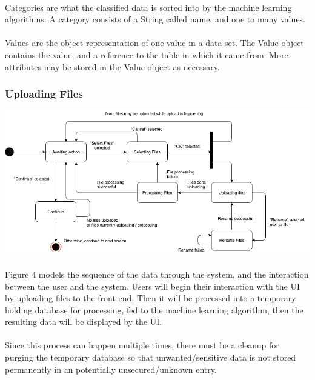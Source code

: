 \documentclass[12pt,oneside,letterpaper]{article}
\begin{document}
\paragraph{} Categories are what the classified data is sorted into by the machine learning algorithms. A category consists of a String called name, and one to many values.
\paragraph{} Values are the object representation of one value in a data set. The Value object contains the value, and a reference to the table in which it came from. More attributes may be stored in the Value object as necessary.

\subsubsection{Uploading Files}
\includegraphics[scale = 0.52]{spencer_state.png}
\begingroup
{}
\endgroup


\paragraph{}Figure 4 models the sequence of the data through the system, and the interaction between the user and the system. Users will begin their interaction with the UI by uploading files to the front-end. Then it will be processed into a temporary holding database for processing, fed to the machine learning algorithm, then the resulting data will be displayed by the UI.
\paragraph{} Since this process can happen multiple times, there must be a cleanup for purging the temporary database so that unwanted/sensitive data is not stored permanently in an potentially unsecured/unknown entry.
\end{document}
